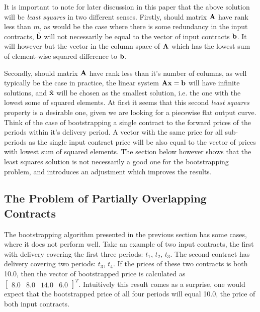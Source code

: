 \documentclass{article}
\begin{document}
It is important to note for later discussion in this paper that the above solution will be 
\emph{least squares} in two different senses. Firstly, should matrix $\mathbf{A}$ have rank less
than $m$, as would be the case where there is some redundancy in the input contracts,
$\hat{\mathbf{b}}$ will not necessarily be equal to the vector of input contracts $\mathbf{b}$. It
will however but the vector in the column space of $\mathbf{A}$ which has the lowest sum of 
element-wise squared difference to $\mathbf{b}$.

Secondly, should matrix $\mathbf{A}$ have rank less
than it's number of columns, as well typically be the case in practice, the linear 
system $\mathbf{A}\mathbf{x} = \mathbf{b}$ will have infinite solutions, and $\hat{\mathbf{x}}$ will be chosen
as the smallest solution, i.e. the one with the lowest some of squared elements.
At first it seems that this second \emph{least squares} property is a desirable one,
given we are looking for a piecewise flat output curve. Think of the case of bootstrapping
a single contract to the forward prices of the periods within it's delivery period. A
vector with the same price for all sub-periods as the single input contract price will 
be also equal to the vector of prices with lowest sum of squared elements. The section 
below however shows that the least squares solution is not necessarily a 
good one for the bootstrapping problem, and introduces an adjustment which improves
the results.




\subsection{The Problem of Partially Overlapping Contracts}

The bootstrapping algorithm presented in the previous section has some cases, 
where it does not perform well. Take an example of two input contracts, the
first with delivery covering the first three periods: $t_1$, $t_2$, $t_3$. The second
contract has delivery covering two periods: $t_3$, $t_4$. If the prices of these
two contracts is both 10.0, then the vector of bootstrapped price is calculated
as $\begin{bmatrix}8.0 & 8.0 & 14.0 & 6.0\end{bmatrix}^T$. Intuitively this 
result comes as a surprise, one would expect that the bootstrapped price of
all four periods will equal 10.0, the price of both input contracts.
\end{document}
